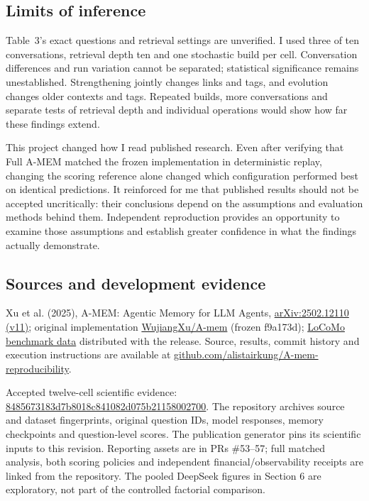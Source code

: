 \documentclass[11pt,a4paper]{article}
\begin{document}
\subsection{Limits of inference}
\enlargethispage{1.5\baselineskip}
Table~3’s exact questions and retrieval settings are unverified. I used three of ten conversations, retrieval depth ten and one stochastic build per cell. Conversation differences and run variation cannot be separated; statistical significance remains unestablished. Strengthening jointly changes links and tags, and evolution changes older contexts and tags. Repeated builds, more conversations and separate tests of retrieval depth and individual operations would show how far these findings extend.

This project changed how I read published research. Even after verifying that Full A-MEM matched the frozen implementation in deterministic replay, changing the scoring reference alone changed which configuration performed best on identical predictions. It reinforced for me that published results should not be accepted uncritically: their conclusions depend on the assumptions and evaluation methods behind them. Independent reproduction provides an opportunity to examine those assumptions and establish greater confidence in what the findings actually demonstrate.

\subsection{Sources and development evidence}
Xu et al. (2025), A-MEM: Agentic Memory for LLM Agents, \href{https://arxiv.org/abs/2502.12110v11}{arXiv:2502.12110 (v11)}; original implementation \href{https://github.com/WujiangXu/A-mem/tree/f9a173dec325d84fcc97e7828775c7b241c33466}{WujiangXu/A-mem} (frozen f9a173d); \href{https://snap-research.github.io/locomo/}{LoCoMo benchmark data} distributed with the release. Source, results, commit history and execution instructions are available at \href{https://github.com/alistairkung/A-mem-reproducibility}{github.com/alistairkung/A-mem-reproducibility}.

Accepted twelve-cell scientific evidence: \href{https://github.com/alistairkung/A-mem-reproducibility/commit/8485673183d7b8018c841082d075b21158002700}{8485673183d7b8018c841082d075b21158002700}. The repository archives source and dataset fingerprints, original question IDs, model responses, memory checkpoints and question-level scores. The publication generator pins its scientific inputs to this revision. Reporting assets are in PRs \#53–57; full matched analysis, both scoring policies and independent financial/observability receipts are linked from the repository. The pooled DeepSeek figures in Section 6 are exploratory, not part of the controlled factorial comparison.

\begingroup
\footnotesize\raggedright
\setlength{\parskip}{0pt}
\let\originalthebibliography\thebibliography
\renewcommand{\thebibliography}[1]{\originalthebibliography{#1}\setlength{\itemsep}{2pt}\setlength{\parsep}{0pt}}


\endgroup
\end{document}
